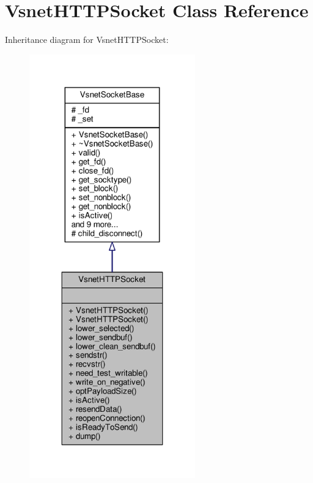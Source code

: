 \hypertarget{classVsnetHTTPSocket}{}\section{Vsnet\+H\+T\+T\+P\+Socket Class Reference}
\label{classVsnetHTTPSocket}


Inheritance diagram for Vsnet\+H\+T\+T\+P\+Socket\+:
\nopagebreak
\begin{figure}[H]
\begin{center}
\leavevmode
\includegraphics[width=203pt]{d4/d30/classVsnetHTTPSocket__inherit__graph}
\end{center}
\end{figure}


